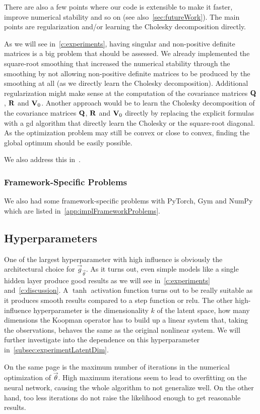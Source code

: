 			There are also a few points where our code is extensible to make it faster, improve numerical stability and so on (see also~\autoref{sec:futureWork}). The main points are regularization and/or learning the Cholesky decomposition directly.

			As we will see in~\autoref{c:experiments}, having singular and non-positive definite matrices is a big problem that should be assessed. We already implemented the square-root smoothing that increased the numerical stability through the smoothing by not allowing non-positive definite matrices to be produced by the smoothing at all (as we directly learn the Cholesky decomposition). Additional regularization might make sense at the computation of the covariance matrices \(\boldsymbol{\mathrm{Q}}\), \(\boldsymbol{\mathrm{R}}\) and \(\boldsymbol{\mathrm{V}}_0\). Another approach would be to learn the Cholesky decomposition of the covariance matrices \(\boldsymbol{\mathrm{Q}}\), \(\boldsymbol{\mathrm{R}}\) and \(\boldsymbol{\mathrm{V}}_0\) directly by replacing the explicit formulas with a \ac{gd} algorithm that directly learn the Cholesky or the square-root diagonal. As the optimization problem may still be convex or close to convex, finding the global optimum should be easily possible.

			We also address this in~.

		\subsubsection{Framework-Specific Problems}
			We also had some framework-specific problems with PyTorch, Gym and NumPy which are listed in~\autoref{app:implFrameworkProblems}.


	\subsection{Hyperparameters}
		One of the largest hyperparameter with high influence is obviously the architectural choice for \( \vec{g}_{\vec{\theta}} \). As it turns out, even simple models like a single hidden layer produce good results as we will see in~\autoref{c:experiments} and~\ref{c:discussion}. A \( \tanh \) activation function turns out to be really suitable as it produces smooth results compared to \eg a step function or \ac{relu}. The other high-influence hyperparameter is the dimensionality \(k\) of the latent space, \ie how many dimensions the Koopman operator has to build up a linear system that, taking the observations, behaves the same as the original nonlinear system. We will further investigate into the dependence on this hyperparameter in~\autoref{subsec:experimentLatentDim}.

		On the same page is the maximum number of iterations in the numerical optimization of \( \vec{\theta} \). High maximum iterations seem to lead to overfitting on the neural network, causing the whole algorithm to not generalize well. On the other hand, too less iterations do not raise the likelihood enough to get reasonable results.
